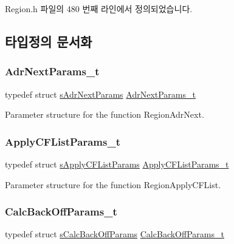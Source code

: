 Region.\+h 파일의 480 번째 라인에서 정의되었습니다.



\subsection{타입정의 문서화}
\mbox{\label{group___r_e_g_i_o_n_ga567c2742622326b350b4e91bbf61b4ce}} 
\subsubsection{\texorpdfstring{Adr\+Next\+Params\+\_\+t}{AdrNextParams\_t}}
{\footnotesize\ttfamily typedef struct \mbox{\hyperlink{structs_adr_next_params}{s\+Adr\+Next\+Params}} \mbox{\hyperlink{group___r_e_g_i_o_n_ga567c2742622326b350b4e91bbf61b4ce}{Adr\+Next\+Params\+\_\+t}}}

Parameter structure for the function Region\+Adr\+Next. \mbox{\label{group___r_e_g_i_o_n_ga71588e9ad07e34b78fa91d51881fd3c6}} 
\subsubsection{\texorpdfstring{Apply\+C\+F\+List\+Params\+\_\+t}{ApplyCFListParams\_t}}
{\footnotesize\ttfamily typedef struct \mbox{\hyperlink{structs_apply_c_f_list_params}{s\+Apply\+C\+F\+List\+Params}} \mbox{\hyperlink{group___r_e_g_i_o_n_ga71588e9ad07e34b78fa91d51881fd3c6}{Apply\+C\+F\+List\+Params\+\_\+t}}}

Parameter structure for the function Region\+Apply\+C\+F\+List. \mbox{\label{group___r_e_g_i_o_n_ga7c5c9a8da174e6679eded8257dc92fd9}} 
\subsubsection{\texorpdfstring{Calc\+Back\+Off\+Params\+\_\+t}{CalcBackOffParams\_t}}
{\footnotesize\ttfamily typedef struct \mbox{\hyperlink{structs_calc_back_off_params}{s\+Calc\+Back\+Off\+Params}} \mbox{\hyperlink{group___r_e_g_i_o_n_ga7c5c9a8da174e6679eded8257dc92fd9}{Calc\+Back\+Off\+Params\+\_\+t}}}

